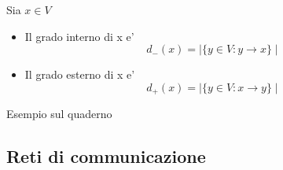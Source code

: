 \documentclass{article}
\begin{document}
        \begin{flushleft}
          Sia $x\in V$
        \end{flushleft}
        \begin{itemize}
          \item Il grado interno di x e'
            \begin{equation*}
              d_-(x)=\mid \{ y\in V:y \to x\} \mid
            \end{equation*}
          \item Il grado esterno di x e'
            \begin{equation*}
              d_+(x)=\mid \{y\in V:x\to y\} \mid
            \end{equation*}
        \end{itemize}
        \begin{flushleft}
          Esempio sul quaderno
        \end{flushleft}
        \subsection{Reti di communicazione}
\end{document}
